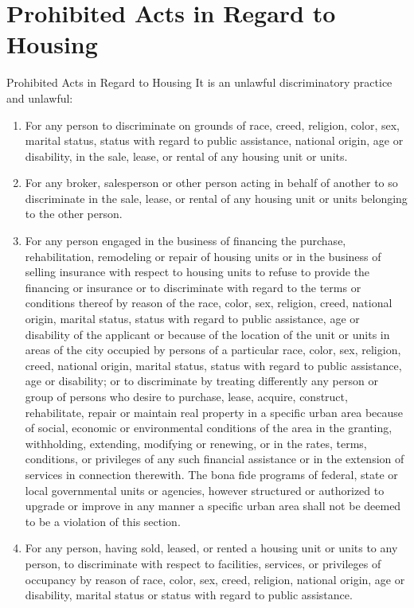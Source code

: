 \section{Prohibited Acts in Regard to Housing}
Prohibited Acts in Regard to Housing
It is an unlawful discriminatory practice and unlawful:
\begin{enumerate}[{\indent}A)]
    \item For any person to discriminate on grounds of race, creed, religion, color, sex, marital status, status with regard to public assistance, national origin, age or disability, in the sale, lease, or rental of any housing unit or units.
    \item For any broker, salesperson or other person acting in behalf of another to so discriminate in the sale, lease, or rental of any housing unit or units belonging to the other person.
    \item For any person engaged in the business of financing the purchase, rehabilitation, remodeling or repair of housing units or in the business of selling insurance with respect to housing units to refuse to provide the financing or insurance or to discriminate with regard to the terms or conditions thereof by reason of the race, color, sex, religion, creed, national origin, marital status, status with regard to public assistance, age or disability of the applicant or because of the location of the unit or units in areas of the city occupied by persons of a particular race, color, sex, religion, creed, national origin, marital status, status with regard to public assistance, age or disability; or to discriminate by treating differently any person or group of persons who desire to purchase, lease, acquire, construct, rehabilitate, repair or maintain real property in a specific urban area because of social, economic or environmental conditions of the area in the granting, withholding, extending, modifying or renewing, or in the rates, terms, conditions, or privileges of any such financial assistance or in the extension of services in connection therewith.  The bona fide programs of federal, state or local governmental units or agencies, however structured or authorized to upgrade or improve in any manner a specific urban area shall not be deemed to be a violation of this section.
    \item For any person, having sold, leased, or rented a housing unit or units to any person, to discriminate with respect to facilities, services, or privileges of occupancy by reason of race, color, sex, creed, religion, national origin, age or disability, marital status or status with regard to public assistance.

\end{enumerate}
